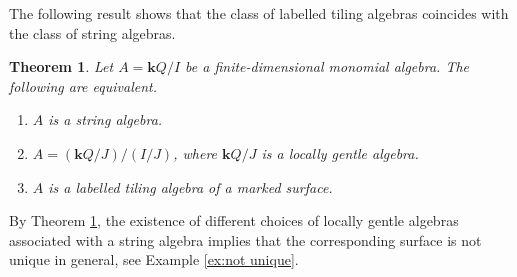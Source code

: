 \documentclass[11pt]{amsart}
\numberwithin{equation}{section}
\newtheorem{theorem}{Theorem}[section]
\theoremstyle{definition}
\begin{document}
The following result shows that the class of labelled tiling algebras coincides with
the class of string algebras.
\begin{theorem}\cite[Theorem 3.1]{BC24}\label{string algebra--labelled tiling algebra}
 Let \( A = \mathbf{k}Q/I \) be a finite-dimensional monomial algebra. The following are equivalent.
 \begin{enumerate}
  \item \( A \) is a string algebra.
  \item \( A = (\mathbf{k}Q/J)/(I/J) \), where \( \mathbf{k}Q/J \) is a locally gentle algebra.
  \item \( A \) is a labelled tiling algebra of a marked surface.
 \end{enumerate}
\end{theorem}
By Theorem \ref{string algebra--labelled tiling algebra}, the existence of different choices of locally gentle algebras associated with a string algebra implies that the corresponding surface is not unique in general, see Example \ref{ex:not unique}. %
\end{document}
